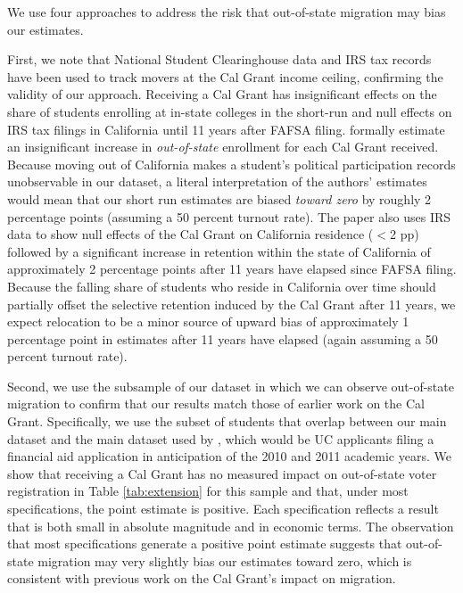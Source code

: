\documentclass[12pt,letterpaper,oneside]{book}
\begin{document}
We use four approaches to address the risk that out-of-state migration may bias our estimates.

First, we note that National Student Clearinghouse data and IRS tax records have been used to track movers at the Cal Grant income ceiling, confirming the validity of our approach. Receiving a Cal Grant has insignificant effects on the share of students enrolling at in-state colleges in the short-run and null effects on IRS tax filings in California until 11 years after FAFSA filing. \cite{bettinger_long-run_2019} formally estimate an insignificant increase in \textit{out-of-state} enrollment for each Cal Grant received. Because moving out of California makes a student's political participation records unobservable in our dataset, a literal interpretation of the authors' estimates would mean that our short run estimates are biased \textit{toward zero} by roughly 2 percentage points (assuming a 50 percent turnout rate). The paper also uses IRS data to show null effects of the Cal Grant on California residence ($<$2 pp) followed by a significant increase in retention within the state of California of approximately 2 percentage points after 11 years have elapsed since FAFSA filing. Because the falling share of students who reside in California over time should partially offset the selective retention induced by the Cal Grant after 11 years, we expect relocation to be a minor source of upward bias of approximately 1 percentage point in estimates after 11 years have elapsed (again assuming a 50 percent turnout rate).

Second, we use the subsample of our dataset in which we can observe out-of-state migration to confirm that our results match those of earlier work on the Cal Grant. Specifically, we use the subset of students that overlap between our main dataset and the main dataset used by \cite{firoozi_effect_2023}, which would be UC applicants filing a financial aid application in anticipation of the 2010 and 2011 academic years. We show that receiving a Cal Grant has no measured impact on out-of-state voter registration in Table \ref{tab:extension} for this sample and that, under most specifications, the point estimate is positive. Each specification reflects a result that is both small in absolute magnitude and in economic terms. The observation that most specifications generate a positive point estimate suggests that out-of-state migration may very slightly bias our estimates toward zero, which is consistent with previous work on the Cal Grant's impact on migration.
\end{document}
